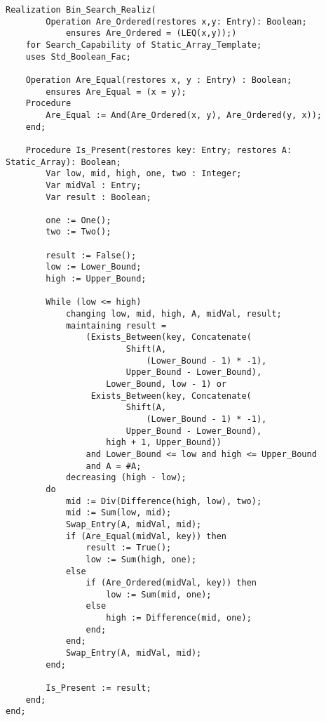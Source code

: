 \begin{lstlisting}[language=resolve]
Realization Bin_Search_Realiz(
		Operation Are_Ordered(restores x,y: Entry): Boolean;
			ensures Are_Ordered = (LEQ(x,y));)
	for Search_Capability of Static_Array_Template;
	uses Std_Boolean_Fac;

	Operation Are_Equal(restores x, y : Entry) : Boolean;
		ensures Are_Equal = (x = y);
	Procedure 
		Are_Equal := And(Are_Ordered(x, y), Are_Ordered(y, x));
	end; 

	Procedure Is_Present(restores key: Entry; restores A: Static_Array): Boolean;
		Var low, mid, high, one, two : Integer;
		Var midVal : Entry;
		Var result : Boolean;

		one := One();
		two := Two();

		result := False();
		low := Lower_Bound;
		high := Upper_Bound;

		While (low <= high)
			changing low, mid, high, A, midVal, result;
			maintaining result =
				(Exists_Between(key, Concatenate(
						Shift(A, 
							(Lower_Bound - 1) * -1), 
						Upper_Bound - Lower_Bound), 
					Lower_Bound, low - 1) or
				 Exists_Between(key, Concatenate(
						Shift(A, 
							(Lower_Bound - 1) * -1), 
						Upper_Bound - Lower_Bound), 
					high + 1, Upper_Bound))
				and Lower_Bound <= low and high <= Upper_Bound
				and A = #A;
			decreasing (high - low);
		do
			mid := Div(Difference(high, low), two);
			mid := Sum(low, mid);
			Swap_Entry(A, midVal, mid);
			if (Are_Equal(midVal, key)) then
				result := True();
				low := Sum(high, one);
			else 
				if (Are_Ordered(midVal, key)) then
					low := Sum(mid, one);
				else
					high := Difference(mid, one);
				end;
			end;
			Swap_Entry(A, midVal, mid);
		end;

		Is_Present := result;
	end;
end;
\end{lstlisting}
